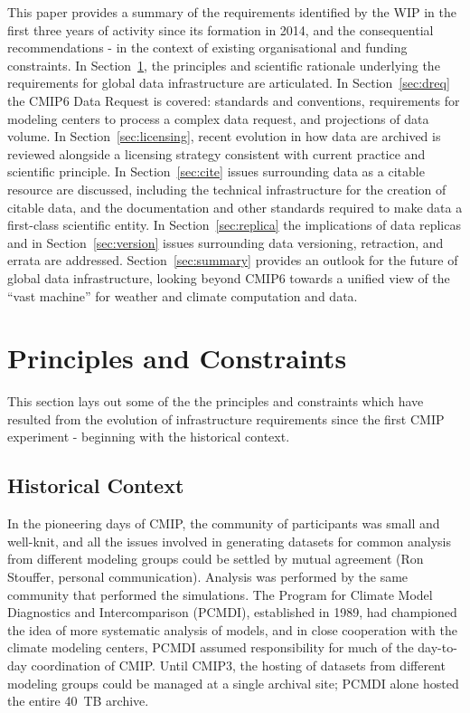 \documentclass[gmd,manuscript]{copernicus}
\begin{document}
This paper provides a summary of the requirements identified by the WIP in
the first three years of activity since its formation in 2014, and
the consequential recommendations - in the context of existing
organisational and funding constraints. 
In Section~\ref{sec:principles}, the principles and scientific rationale
underlying the requirements for global data infrastructure are
articulated. In Section~\ref{sec:dreq} the CMIP6 Data Request is covered:
standards and conventions, requirements for modeling centers to
process a complex data request, and projections of data volume. 
In Section~\ref{sec:licensing}, recent
evolution in how data are archived is reviewed alongside a licensing
strategy consistent with current practice and scientific principle. In
Section~\ref{sec:cite} issues surrounding data as a citable resource are
discussed, including the technical infrastructure for the creation of
citable data, and the documentation and other standards required to
make data a first-class scientific entity. In Section~\ref{sec:replica} the
implications of data replicas and in Section~\ref{sec:version} issues
surrounding data versioning, retraction, and errata are addressed.
Section~\ref{sec:summary} provides an outlook for the future of global data
infrastructure, looking beyond CMIP6 towards a unified view of
the ``vast machine'' for weather and climate computation and data.


\section{Principles and Constraints}
\label{sec:principles}

This section lays out some of the the principles and constraints
which have resulted from the evolution of infrastructure requirements since
the first CMIP experiment - beginning with the historical context.

\subsection{Historical Context}

 In the pioneering days of CMIP, the community of participants was
small and well-knit, and all the issues involved in generating
datasets for common analysis from different modeling groups could be
settled by mutual agreement (Ron Stouffer, personal communication).
Analysis was performed by the same community that performed the
simulations. The Program for Climate Model Diagnostics and
Intercomparison (PCMDI), established in 1989, had championed the idea
of more systematic analysis of models, and in close cooperation with
the climate modeling centers, PCMDI assumed responsibility for
much of the day-to-day coordination of CMIP. Until CMIP3, the hosting
of datasets from different modeling groups could be managed at a
single archival site; PCMDI alone hosted the entire 40~TB archive.
\end{document}
